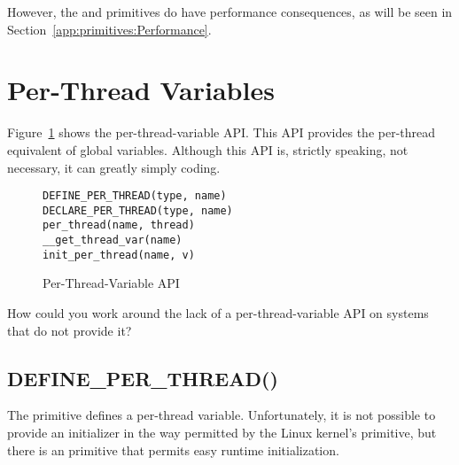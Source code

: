 However, the  and  primitives
do have performance consequences, as will be seen in
Section~\ref{app:primitives:Performance}.

\section{Per-Thread Variables}
\label{app:primitives:Per-Thread Variables}

Figure~\ref{fig:intro:Per-Thread-Variable API}
shows the per-thread-variable API.
This API provides the per-thread equivalent of global variables.
Although this API is, strictly speaking, not necessary, it can
greatly simply coding.

\begin{figure}[htbp]
{ \scriptsize
\begin{verbatim}
DEFINE_PER_THREAD(type, name)
DECLARE_PER_THREAD(type, name)
per_thread(name, thread)
__get_thread_var(name)
init_per_thread(name, v)
\end{verbatim}
}
\caption{Per-Thread-Variable API}
\label{fig:intro:Per-Thread-Variable API}
\end{figure}

\QuickQuiz{}
	How could you work around the lack of a per-thread-variable
	API on systems that do not provide it?
 \QuickQuizEnd

\subsection{DEFINE\_PER\_THREAD()}

The  primitive defines a per-thread variable.
Unfortunately, it is not possible to provide an initializer in the way
permitted by the Linux kernel's  primitive,
but there is an  primitive that permits easy
runtime initialization.

